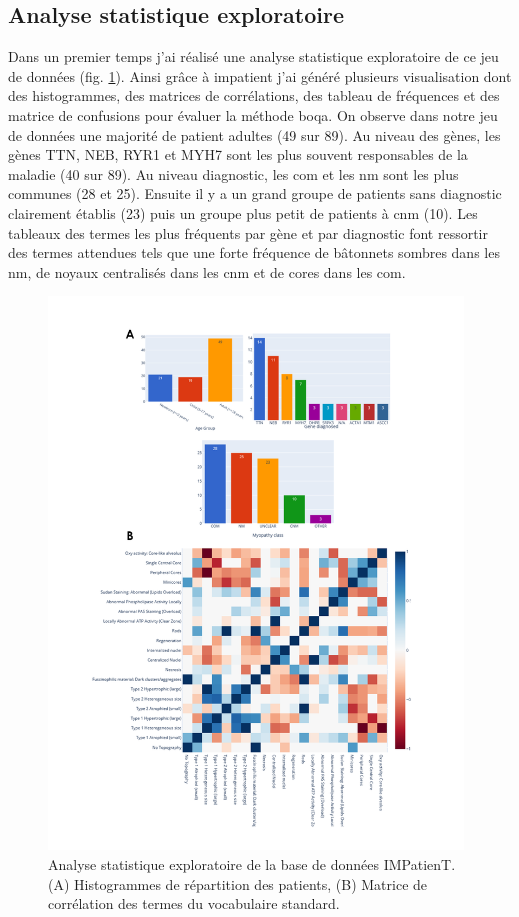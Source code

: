 \subsection{Analyse statistique exploratoire}
Dans un premier temps j'ai réalisé une analyse statistique exploratoire de ce jeu de données (fig. \ref{fig:impatient_eda}). Ainsi grâce à \gls{impatient} j'ai généré plusieurs visualisation dont des histogrammes, des matrices de corrélations, des tableau de fréquences et des matrice de confusions pour évaluer la méthode \gls{boqa}.  On observe dans notre jeu de données une majorité de patient adultes (49 sur 89). Au niveau des gènes, les gènes TTN, NEB, RYR1 et MYH7 sont les plus souvent responsables de la maladie (40 sur 89). Au niveau diagnostic, les \gls{com} et les \gls{nm} sont les plus communes (28 et 25). Ensuite il y a un grand groupe de patients sans diagnostic clairement établis (23) puis un groupe plus petit de patients à \gls{cnm} (10). Les tableaux des termes les plus fréquents par gène et par diagnostic font ressortir des termes attendues tels que une forte fréquence de bâtonnets sombres dans les \gls{nm}, de noyaux centralisés dans les \gls{cnm} et de cores dans les \gls{com}.
\begin{figure}[htbp]
  \centering
  \includegraphics[width=0.98\textwidth]{figures/impatient_explo.png}
  \caption[Analyse statistique exploratoire IMPatienT]{Analyse statistique exploratoire de la base de données IMPatienT. (A) Histogrammes de répartition des patients, (B) Matrice de corrélation des termes du vocabulaire standard.}
  \label{fig:impatient_eda}
\end{figure}
